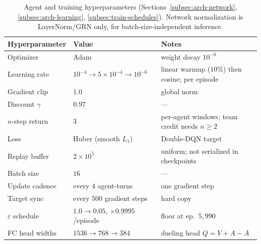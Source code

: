 \begin{table}[h]
\centering
\small
\begin{tabular}{lll}
\toprule
\textbf{Hyperparameter} & \textbf{Value} & \textbf{Notes} \\
\midrule
Optimizer                 & Adam           & weight decay $10^{-6}$ \\
Learning rate             & $10^{-4}\!\to\!5\times10^{-4}\!\to\!10^{-6}$ & linear warmup ($10\%$) then cosine; per episode \\
Gradient clip             & $1.0$          & global norm \\
Discount $\gamma$         & $0.97$         & --- \\
$n$-step return           & $3$            & per-agent windows; team credit needs $n\!\ge\!2$ \\
Loss                      & Huber (smooth $L_1$) & Double-DQN target \\
Replay buffer             & $2\times10^5$  & uniform; not serialized in checkpoints \\
Batch size                & $16$           & --- \\
Update cadence            & every $4$ agent-turns & one gradient step \\
Target sync               & every $500$ gradient steps & hard copy \\
$\varepsilon$ schedule    & $1.0\!\to\!0.05$, $\times0.9995$/episode & floor at ep.\ $5{,}990$ \\
FC head widths            & $1536\!\to\!768\!\to\!384$ & dueling head $Q=V+A-\overline{A}$ \\
\bottomrule
\end{tabular}
\caption{Agent and training hyperparameters (Sections~\ref{subsec:arch-network},
\ref{subsec:arch-learning}, \ref{subsec:train-schedules}). Network
normalization is LayerNorm/GRN only, for batch-size-independent inference.}
\label{tab:app-agent}
\end{table}

